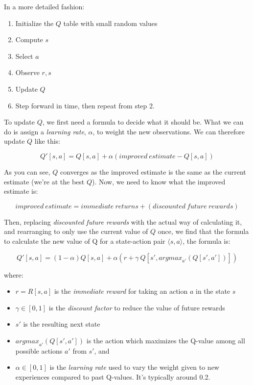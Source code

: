 \noindent In a more detailed fashion:

\begin{enumerate}
\item Initialize the $Q$ table with small random values
\item Compute $s$
\item Select $a$
\item Observe $r, s$
\item Update $Q$
\item Step forward in time, then repeat from step 2.
\end{enumerate}

\noindent To update $Q$, we first need a formula to decide what it should be. What we can do is assign a \textit{learning rate}, $\alpha$, to weight the new observations. We can therefore update $Q$ like this:

\begin{equation*}
Q'[s,a] = Q[s,a] + \alpha({improved\ estimate} - Q[s,a])
\end{equation*}

\noindent As you can see, $Q$ converges as the improved estimate is the same as the current estimate (we're at the best $Q$). Now, we need to know what the improved estimate is:

\begin{equation*}
improved\ estimate = immediate\ returns + (discounted\ future\ rewards)
\end{equation*}

\noindent Then, replacing \textit{discounted future rewards} with the actual way of calculating it, and rearranging to only use the current value of $Q$ once, we find that the formula to calculate the new value of Q for a state-action pair $\langle s,a\rangle$, the formula is:

\begin{equation}
Q'[s,a] = (1-\alpha)Q[s,a] + \alpha (r+\gamma\ Q[s',{argmax}_{a'}(Q[s',a'])])
\end{equation}

\noindent where:
\begin{itemize}
\item $r = R[s,a]$ is the \textit{immediate reward} for taking an action $a$ in the state $s$
\item $\gamma \in [0,1]$ is the \textit{discount factor} to reduce the value of future rewards
\item $s'$ is the resulting next state
\item ${argmax}_{a'}(Q[s',a'])$ is the action which maximizes the Q-value among all possible actions $a'$ from $s'$, and
\item $\alpha \in [0,1]$ is the \textit{learning rate} used to vary the weight given to new experiences compared to past Q-values. It's typically around 0.2.
\end{itemize}

